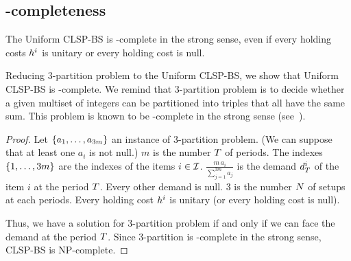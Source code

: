 \subsection{\NP-completeness}


\begin{thm}
  The Uniform CLSP-BS is \NP-complete in the strong sense, even if every holding costs $h^i$ is unitary or every holding cost is null.
\end{thm}





Reducing 3-partition problem to the Uniform CLSP-BS, we show that Uniform CLSP-BS is \NP-complete. We remind that 3-partition problem is to decide whether a given multiset of integers can be partitioned into triples that all have the same sum. This problem is known to be \NP-complete in the strong sense (see~\cite{Garey1979}).



\begin{proof}
Let $\crbracket{a_1,\ldots,a_{3m}}$ an instance of 3-partition problem. (We can suppose that at least one $a_i$ is not null.)
$m$ is the number $T$ of periods.
The indexes $\crbracket{1,\ldots,3m}$ are the indexes of the items $i\in\mathcal{I}$.
$\frac{m\,a_i}{\sum_{j=1}^{3m}a_j}$ is the demand $d_{T}^i$ of the item $i$ at the period $T$. Every other demand is null.
3 is the number $N$ of setups at each periods.
Every holding cost $h^i$ is unitary (or every holding cost is null).

Thus, we have a solution for 3-partition problem if and only if we can face the demand at the period $T$. Since 3-partition is \NP-complete in the strong sense, CLSP-BS is NP-complete.
\end{proof}


